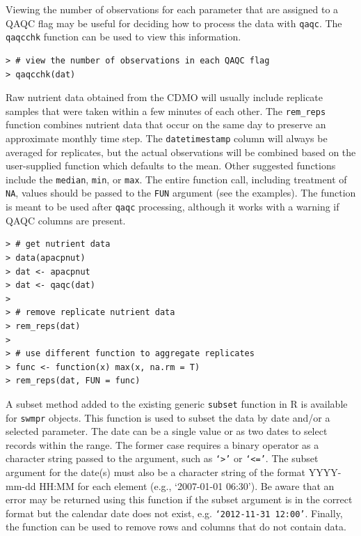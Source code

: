 \documentclass[10pt,letterpaper]{article}\usepackage[]{graphicx}\usepackage[]{color}
\makeatletter
\newenvironment{kframe}{%
 \def\at@end@of@kframe{}%
 \ifinner\ifhmode%
  \def\at@end@of@kframe{\end{minipage}}%
  \begin{minipage}{\columnwidth}%
 \fi\fi%
 \def\FrameCommand##1{\hskip\@totalleftmargin \hskip-\fboxsep
 \colorbox{shadecolor}{##1}\hskip-\fboxsep
     \hskip-\linewidth \hskip-\@totalleftmargin \hskip\columnwidth}%
 \MakeFramed {\advance\hsize-\width
   \@totalleftmargin\z@ \linewidth\hsize
   \@setminipage}}%
 {\par\unskip\endMakeFramed%
 \at@end@of@kframe}
\newenvironment{knitrout}{}{} %
\makeatother
\begin{document}
Viewing the number of observations for each parameter that are assigned to a \gls{QAQC} flag may be useful for deciding how to process the data with \texttt{qaqc}.  The \texttt{qaqcchk} function can be used to view this information.

\begin{knitrout}\small
{}\color{fgcolor}\begin{kframe}
\begin{verbatim}
> # view the number of observations in each QAQC flag
> qaqcchk(dat)
\end{verbatim}
\end{kframe}
\end{knitrout}

Raw nutrient data obtained from the \gls{CDMO} will usually include replicate samples that were taken within a few minutes of each other.  The \texttt{rem\_reps} function combines nutrient data that occur on the same day to preserve an approximate monthly time step.  The \texttt{datetimestamp} column will always be averaged for replicates, but the actual observations will be combined based on the user-supplied function which defaults to the mean.  Other suggested functions include the \texttt{median}, \texttt{min}, or \texttt{max}.  The entire function call, including treatment of \texttt{NA}, values should be passed to the \texttt{FUN} argument (see the examples).  The function is meant to be used after \texttt{qaqc} processing, although it works with a warning if \gls{QAQC} columns are present.

\begin{knitrout}\small
{}\color{fgcolor}\begin{kframe}
\begin{verbatim}
> # get nutrient data
> data(apacpnut)
> dat <- apacpnut
> dat <- qaqc(dat)
> 
> # remove replicate nutrient data
> rem_reps(dat)
> 
> # use different function to aggregate replicates
> func <- function(x) max(x, na.rm = T)
> rem_reps(dat, FUN = func)
\end{verbatim}
\end{kframe}
\end{knitrout}

A subset method added to the existing generic \texttt{subset} function in R is available for \texttt{swmpr} objects.  This function is used to subset the data by date and/or a selected parameter.  The date can be a single value or as two dates to select records within the range. The former case requires a binary operator as a character string passed to the argument, such as \texttt{`>'} or \texttt{`<='}.  The subset argument for the date(s) must also be a character string of the format YYYY-mm-dd HH:MM for each element (e.g., `2007-01-01 06:30').  Be aware that an error may be returned using this function if the subset argument is in the correct format but the calendar date does not exist, e.g. \texttt{`2012-11-31 12:00'}.  Finally, the function can be used to remove rows and columns that do not contain data. 
\end{document}
